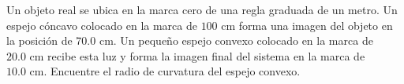 \item Un objeto real se ubica en la marca cero de una regla graduada de un metro. Un espejo cóncavo colocado en la marca de $100\text{ cm}$ forma una imagen del objeto en la posición de $70.0\text{ cm}$. Un pequeño espejo convexo colocado en la marca de $20.0\text{ cm}$ recibe esta luz y forma la imagen final del sistema en la marca de $10.0\text{ cm}$. Encuentre el radio de curvatura del espejo convexo.